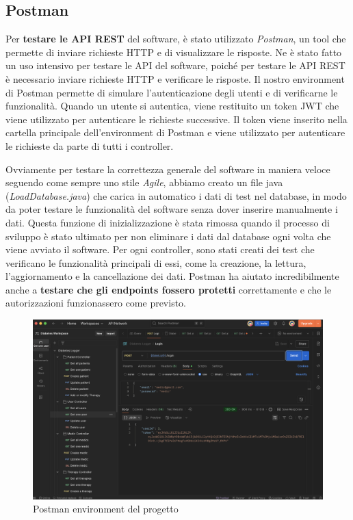 \documentclass[a4paper]{article}
\begin{document}
\subsection{Postman}

Per \textbf{testare le API REST} del software, è stato utilizzato \textit{Postman}, un tool che permette di inviare richieste HTTP 
e di visualizzare le risposte. Ne è stato fatto un uso intensivo per testare le API del software,
poiché per testare le API REST è necessario inviare richieste HTTP e verificare le risposte.
Il nostro environment di Postman permette di simulare l'autenticazione degli utenti e di verificarne 
le funzionalità. Quando un utente si autentica, viene restituito un token JWT che viene utilizzato per
autenticare le richieste successive. Il token viene inserito nella cartella principale
dell'environment di Postman e viene utilizzato per autenticare le richieste da parte di tutti i controller.


\vspace{1em}
\noindent
Ovviamente per testare la correttezza generale del software in maniera veloce seguendo come sempre
uno stile \textit{Agile}, abbiamo creato un file java (\textit{LoadDatabase.java}) che carica in automatico i dati 
di test nel database,
in modo da poter testare le funzionalità del software senza dover inserire manualmente i dati.
Questa funzione di inizializzazione è stata rimossa quando il processo di sviluppo è stato ultimato per non
eliminare i dati dal database ogni volta che viene avviato il software.
Per ogni controller, sono stati creati dei test che verificano le funzionalità principali di essi, come 
la creazione, la lettura, l'aggiornamento e la cancellazione dei dati.
Postman ha aiutato incredibilmente anche a \textbf{testare che gli endpoints fossero protetti} correttamente e 
che le autorizzazioni funzionassero come previsto.

\begin{figure}[H]
  \begin{center}
    \includegraphics[width=1\textwidth]{postman.png}
  \end{center}
  \caption{Postman environment del progetto} 
  \label{fig:postman}
\end{figure}
\noindent
\end{document}
